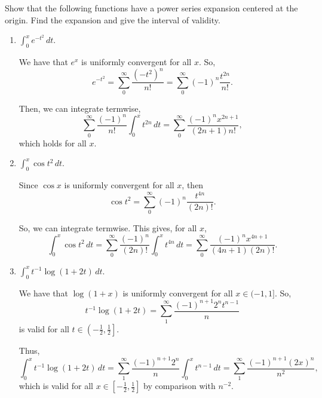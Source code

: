 \documentclass[../hw3]{subfiles}
\begin{document}
\begin{problem}
Show that the following functions have a power series expansion centered at the origin.
Find the expansion and give the interval of validity.
\end{problem}
\begin{enumerate}[label=\alph*)]
	\item $\int_{0}^{x} e^{-t^2} \,dt$.

	      We have that $e^x$ is uniformly convergent for all  $x$.
	      So, \[
		      e^{-t^2}=\sum_{0}^{\infty} \frac{(-t^2)^n}{n!}=\sum_{0}^{\infty} (-1)^n \frac{t^{2n}}{n!}
		      .\]

	      Then, we can integrate termwise, \[
		      \sum_{0}^{\infty} \frac{(-1)^n}{n!}\int_{0}^{x} t^{2n} \,dt = \sum_{0}^{\infty} \frac{(-1)^n x^{2n+1}}{(2n+1)n!}
		      ,\] which holds for all $x$.

	\item $\int_{0}^{x} \cos{t^2}  \,dt$.

	      Since $\cos{x} $ is uniformly convergent for all $x$, then  \[
		      \cos{t^2} = \sum_{0}^{\infty} (-1)^n \frac{t^{4n}}{(2n)!}
		      .\]

	      So, we can integrate termwise.
	      This gives, for all $x$, \[
		      \int_{0}^{x} \cos{t^2}  \,dt = \sum_{0}^{\infty} \frac{(-1)^n}{(2n)!}\int_{0}^{x} t^{4n} \,dt = \sum_{0}^{\infty} \frac{(-1)^nx^{4n+1}}{(4n+1)(2n)!}
		      .\]

	\item $\int_{0}^{x} t^{-1}\log{( 1+2t )} \,dt$.

	      We have that  $\log{( 1+x )}$ is uniformly convergent for all $x \in (-1,1]$.
	      So, \[
		      t^{-1}\log{(1+2t)} = \sum_{1}^{\infty} \frac{(-1)^{n+1} 2^n t^{n-1}}{n}
	      \] is valid for all $t \in \left( -\frac{1}{2},\frac{1}{2}  \right]$.

	      Thus, \[
		      \int_{0}^{x} t^{-1}\log{(1+2t)}  \,dt = \sum_{1}^{\infty} \frac{(-1)^{n+1}2^n}{n}\int_{0}^{x} t^{n-1} \,dt = \sum_{1}^{\infty} \frac{(-1)^{n+1}(2x)^n}{n^2}
		      ,\] which is valid for all $x \in \left[ -\frac{1}{2},\frac{1}{2}  \right]$ by comparison with $n^{-2}$.
\end{enumerate}
\end{document}
